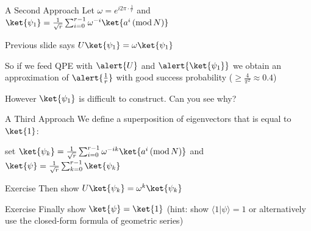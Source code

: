 \documentclass{beamer}
\begin{document}
\begin{frame}{A Second Approach}
        Let $\omega = e^{i 2 \pi \cdot \frac{1}{r}}$ and $\ket{\psi_1} =
        \frac{1}{\sqrt{r}} \sum_{i = 0}^{r-1} \omega^{-i} \ket{a^{i} \,
        (\mathrm{mod} \, N) }$

        Previous slide says $U\ket{\psi_1} = \omega \ket{\psi_1}$

        So if we feed QPE with  $\alert{U}$ and  $\alert{\ket{\psi_1}}$ we
        obtain an approximation of $\alert{\frac{1}{r}}$ with good success
        probability ($\geq \frac{4}{\pi^2} \approx 0.4$)

        \pause
        However $\ket{\psi_1}$ is difficult to construct. Can you see why?

\end{frame}

\newcommand{\iprod}[2]{ \langle #1 | #2 \rangle}

\begin{frame}{A Third Approach}
        We define a \alert{superposition of eigenvectors}
        that is equal to $\ket{1}$:

        set $\ket{\psi_k} = \textstyle{ \frac{1}{\sqrt{r}} \sum_{i = 0}^{r - 1} \omega^{-ik}
        \ket{a^i \, (\mathrm{mod} \, N)} }$ and $\ket{\psi} = \textstyle{
        \frac{1}{\sqrt{r}} \sum_{k = 0}^{r-1} \ket{\psi_k} }$

        \begin{block}{Exercise}
                Then show $U\ket{\psi_k} = \omega^k \ket{\psi_k}$
        \end{block}

        \begin{block}{Exercise} Finally show $\ket{\psi} = \ket{1}$ (hint:
        show $\iprod{1}{\psi} = 1$ or alternatively use the closed-form
        formula of geometric series) 
        \end{block}
\end{frame}
\end{document}
